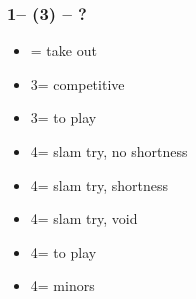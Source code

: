 \documentclass[12pt, a4paper]{article}
\begin{document}
\subsubsection*{1\spades -- (3\hearts) -- ?}
\begin{itemize}
    \item \dbl = take out
    \item 3\spades = competitive
    \item 3\nt = to play
    \item 4\clubs = slam try, no \diams shortness
    \item 4\diams = slam try, \diams shortness
    \item 4\hearts = slam try, \hearts void
    \item 4\spades = to play
    \item 4\nt = minors
\end{itemize}

\end{document}
